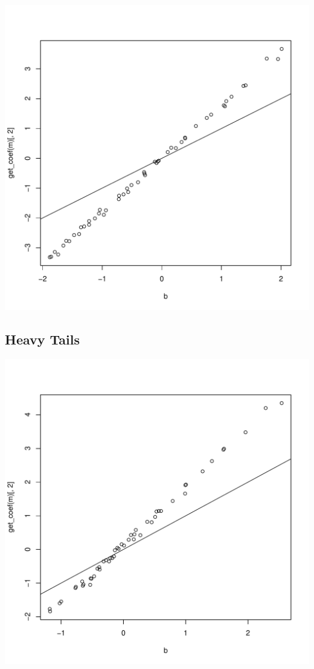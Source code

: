 \documentclass{article}\usepackage[]{graphicx}\usepackage[]{color}
\makeatletter
\def\maxwidth{ %
  \ifdim\Gin@nat@width>\linewidth
    \linewidth
  \else
    \Gin@nat@width
  \fi
}
\newenvironment{knitrout}{}{} %
\makeatother
\begin{document}
\begin{knitrout}
\color{fgcolor}
\includegraphics[width=\maxwidth]{figure/unnamed-chunk-5-1} 

\end{knitrout}

\subsection{Heavy Tails}

\begin{knitrout}
\color{fgcolor}
\includegraphics[width=\maxwidth]{figure/unnamed-chunk-6-1} 

\end{knitrout}
\end{document}
